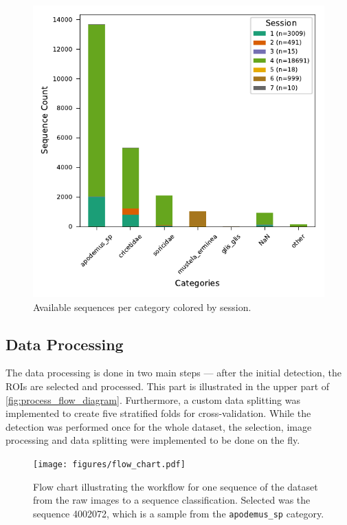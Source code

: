     \begin{figure}[H]
    \centering
    \includegraphics{figures/label2_session.pdf}
    \caption{Available sequences per category colored by session.}
    \label{fig:sequenceperlabel}
    \end{figure}

    \subsection{Data Processing}

    The data processing is done in two main steps --- after the initial detection, the \acsp{ROI} are selected and processed.
    This part is illustrated in the upper part of \autoref{fig:process_flow_diagram}.
    Furthermore, a custom data splitting was implemented to create five stratified folds for cross-validation.
    While the detection was performed once for the whole dataset, the selection, image processing and data splitting were implemented to be done on the fly.

    \begin{figure}[p]
    \centering
    \texttt{[image: figures/flow\_chart.pdf]}
    \caption{
        Flow chart illustrating the workflow for one sequence of the dataset from the raw images to a sequence classification. 
        Selected was the sequence 4002072, which is a sample from the \texttt{apodemus\_sp} category.
        }
    \label{fig:process_flow_diagram}
    \end{figure}

